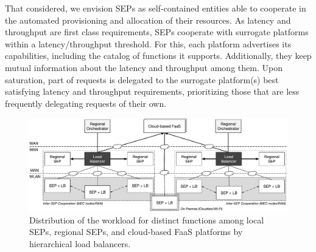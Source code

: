 That considered,
we envision SEPs as self-contained entities able to cooperate in the automated provisioning and allocation of their resources. 
As latency and throughput are first class requirements,
SEPs cooperate
with surrogate platforms within a latency/throughput threshold. For this, each platform advertises its capabilities, including the catalog of functions it supports. Additionally, they keep mutual information about the latency and throughput among them. Upon saturation, part of requests is delegated to the surrogate platform(s) best satisfying latency and throughput requirements, prioritizing those that are less frequently delegating requests of their own.









\begin{figure}[bh]
	\centering
	\includegraphics[width=1\linewidth]{Figs/Edge_Load_Placement_Expanded}
	\caption{Distribution of the workload for distinct functions among local SEPs, regional SEPs, and cloud-based FaaS platforms by hierarchical load balancers.}
	\label{fig:Edge_Load_Placement}
\end{figure}

